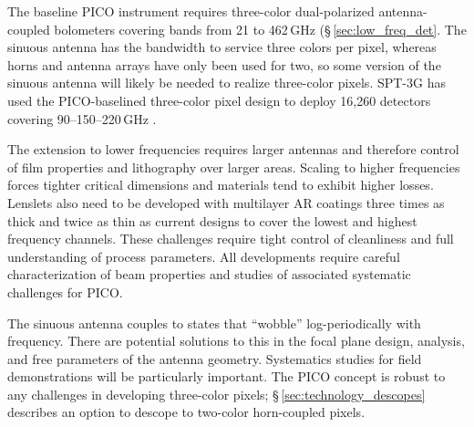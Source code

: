 

The baseline PICO instrument requires three-color dual-polarized
antenna-coupled bolometers covering bands from 21 to 462\,GHz 
(\S\,\ref{sec:low_freq_det}.  The sinuous antenna has the
bandwidth to service three colors per pixel, whereas horns and antenna
arrays have only been used for two, so some version of the sinuous
antenna will likely be needed to realize three-color pixels.  SPT-3G
has used the PICO-baselined three-color pixel design to deploy 16,260
detectors covering 90--150--220\,GHz \citep{Dutcher2018}.

The extension to lower frequencies requires larger antennas and
therefore control of film properties and lithography over larger
areas. Scaling to higher frequencies forces tighter critical
dimensions and materials tend to exhibit higher losses. Lenslets also
need to be developed with multilayer AR coatings three times as thick
and twice as thin as current designs to cover the lowest and highest
frequency channels. These challenges require tight control of
cleanliness and full understanding of process parameters. All
developments require careful characterization of beam properties and
studies of associated systematic challenges for PICO.

The sinuous antenna couples to
states that ``wobble'' log-periodically with frequency. There are
potential solutions to this in the focal plane design, analysis, and
free parameters of the antenna geometry.  Systematics studies for field
demonstrations will be particularly important. The PICO concept is
robust to any challenges in developing three-color pixels;
\S\,\ref{sec:technology_descopes} describes an option to descope to
two-color horn-coupled pixels.


